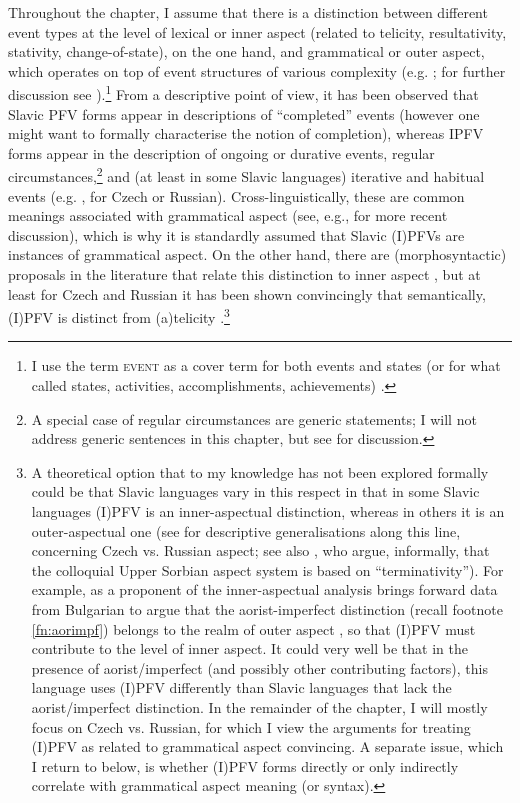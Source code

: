 \documentclass[output=paper,colorlinks,citecolor=brown]{langscibook}
\begin{document}
Throughout the chapter, I assume that there is a distinction between different event types at the level of lexical or inner aspect (related to telicity, resultativity, stativity, change-of-state), on the one hand, and grammatical or outer aspect, which operates on top of event structures of various complexity (e.g. \citealt{Smith1991,Filip1999}; for further discussion see \citealt{Gehrke2008}).\footnote{I use the term \textsc{event} as a cover term for both events and states (or for what \citealt{Vendler1957} called states, activities, accomplishments, achievements)%
.} From a descriptive point of view, it has been observed that Slavic PFV forms appear in descriptions of ``completed'' events (however one might want to formally characterise the notion of completion), whereas IPFV forms appear in the description of ongoing or durative events, regular circumstances,\footnote{A special case of regular circumstances are generic statements; I will not address generic sentences in this chapter, but see  for discussion.} and (at least in some Slavic languages) iterative and habitual events (e.g. \citealt{isacenko62,Filip1999,%
Borik2006}, for Czech or Russian). Cross-linguistically, these are common meanings associated with grammatical aspect (see, e.g., \citealt{deo15} for more recent discussion), which is why it is standardly assumed that Slavic (I)PFVs are instances of grammatical aspect. On the other hand, there are (morphosyntactic) proposals in the literature that relate this distinction to inner aspect \citep[e.g.][]{arsenijevic06,lazorczyk10}, but at least for Czech and Russian it has been shown convincingly that semantically, (I)PFV is distinct from (a)telicity \citep[see, e.g.,][]{Filip1999, Borik2006, Gehrke2008}.\footnote{\label{fn:innerouter}A theoretical option that to my knowledge has not been explored formally could be that Slavic languages vary in this respect in that in some Slavic languages (I)PFV is an inner-aspectual distinction, whereas in others it is an outer-aspectual one (see \citealt{stunova93} for descriptive generalisations along this line, concerning Czech vs. Russian aspect; see also \citealt{breu00,scholze08}, who argue, informally, that the colloquial Upper Sorbian aspect system is based on ``terminativity''). For example, \citet{lazorczyk10} as a proponent of the inner-aspectual analysis brings forward data from Bulgarian to argue that the aorist-imperfect distinction (recall footnote \ref{fn:aorimpf}) belongs to the realm of outer aspect%
, so that (I)PFV must contribute to the level of inner aspect. It could very well be that in the presence of aorist/imperfect (and possibly other contributing factors), this language uses (I)PFV differently than Slavic languages that lack the aorist/imperfect distinction. In the remainder of the chapter, I will mostly focus on Czech vs. Russian, for which I view the arguments for treating (I)PFV as related to grammatical aspect convincing. A separate issue, which I return to below, is whether (I)PFV forms directly or only indirectly correlate with grammatical aspect meaning (or syntax).} 
\end{document}
